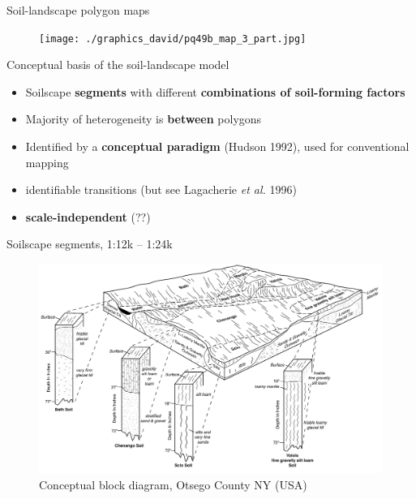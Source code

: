 \documentclass[aspectratio=169, 10pt]{beamer}
\begin{document}
\begin{frame}{Soil-landscape polygon maps}
\begin{figure}
    \centering    \texttt{[image: ./graphics\_david/pq49b\_map\_3\_part.jpg]}
\end{figure}  
\end{frame}

\begin{frame}{Conceptual basis of the soil-landscape model}
    \begin{itemize}
        \item Soilscape \textbf{segments} with different \textbf{combinations of soil-forming factors}
        \item Majority of heterogeneity is \textbf{between} polygons
        \item Identified by a \textbf{conceptual paradigm} (Hudson 1992), used for conventional mapping
        \item identifiable transitions (but see Lagacherie \textit{et al.} 1996)
        \item \textbf{scale-independent} (??)
    \end{itemize}
\end{frame}

\begin{frame}{Soilscape segments, 1:12k -- 1:24k}
    \begin{figure}
        \centering
\includegraphics[height=0.65\textheight]{./graphics_david/NY-2010-09-28-14.pdf}\\
{Conceptual block diagram, Otsego County NY (USA)}
     \end{figure}
\end{frame}
\end{document}
